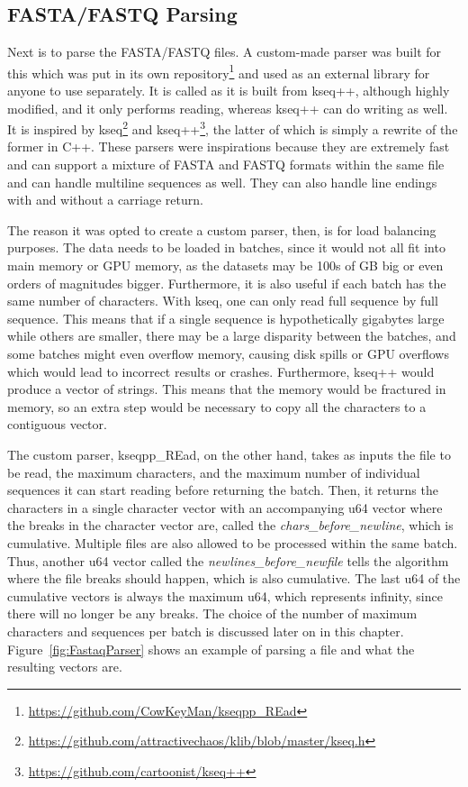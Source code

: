\subsection{FASTA/FASTQ Parsing}

Next is to parse the FASTA/FASTQ files.
A custom-made parser was built for this which was put in its own repository\footnote{\url{https://github.com/CowKeyMan/kseqpp_REad}} and used as an external library for anyone to use separately.
It is called  as it is built from kseq++, although highly modified, and it only performs reading, whereas kseq++ can do writing as well.
It is inspired by kseq\footnote{\url{https://github.com/attractivechaos/klib/blob/master/kseq.h}} and kseq++\footnote{\url{https://github.com/cartoonist/kseq++}}, the latter of which is simply a rewrite of the former in C++.
These parsers were inspirations because they are extremely fast and can support a mixture of FASTA and FASTQ formats within the same file and can handle multiline sequences as well.
They can also handle line endings with and without a carriage return.

The reason it was opted to create a custom parser, then, is for load balancing purposes.
The data needs to be loaded in batches, since it would not all fit into main memory or GPU memory, as the datasets may be 100s of GB big or even orders of magnitudes bigger.
Furthermore, it is also useful if each batch has the same number of characters.
With kseq, one can only read full sequence by full sequence.
This means that if a single sequence is hypothetically gigabytes large while others are smaller, there may be a large disparity between the batches, and some batches might even overflow memory, causing disk spills or GPU overflows which would lead to incorrect results or crashes.
Furthermore, kseq++ would produce a vector of strings.
This means that the memory would be fractured in memory, so an extra step would be necessary to copy all the characters to a contiguous vector.

The custom parser, kseqpp\_REad, on the other hand, takes as inputs the file to be read, the maximum characters, and the maximum number of individual sequences it can start reading before returning the batch.
Then, it returns the characters in a single character vector with an accompanying u64 vector where the breaks in the character vector are, called the \textit{chars\_before\_newline}, which is cumulative.
Multiple files are also allowed to be processed within the same batch.
Thus, another u64 vector called the \textit{newlines\_before\_newfile} tells the algorithm where the file breaks should happen, which is also cumulative.
The last u64 of the cumulative vectors is always the maximum u64, which represents infinity, since there will no longer be any breaks.
The choice of the number of maximum characters and sequences per batch is discussed later on in this chapter.
Figure~\ref{fig:FastaqParser} shows an example of parsing a file and what the resulting vectors are.

